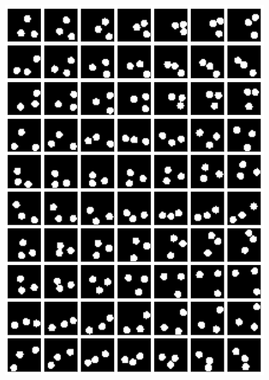 \begin{frame}
\begin{figure}[h!]
\begin{minipage}{0.115\textwidth}
	\end{minipage}
	\begin{minipage}{0.26\textwidth}
		\center{}
		\includegraphics[scale=0.19]{Bilder/bouncingBalls_ODEorig2}
	\end{minipage}
	\begin{minipage}{0.35\textwidth}
		\center{}

\end{minipage}
\end{figure}
\end{frame}
